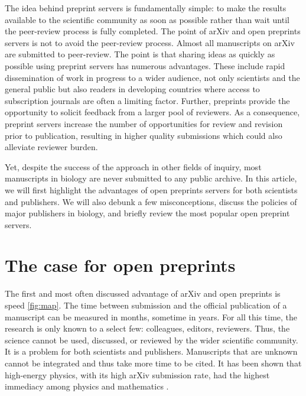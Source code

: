 \documentclass[letterpaper,twocolumn,superscriptaddress,showkeys]{revtex4}
\begin{document}
The idea behind preprint servers is fundamentally simple: to make the results
available to the scientific community as soon as possible rather than wait until
the peer-review process is fully completed. The point of arXiv and open
preprints servers is not to avoid the peer-review process. Almost all
manuscripts on arXiv are submitted to peer-review.  The point is that sharing
ideas as quickly as possible using preprint servers has numerous advantages.
These include rapid dissemination of work in progress to a wider audience, not
only scientists and the general public but also readers in developing countries
where access to subscription journals are often a limiting factor. Further,
preprints provide the opportunity to solicit feedback from a larger pool of
reviewers. As a consequence, preprint servers increase the number of
opportunities for review and revision prior to publication, resulting in higher
quality submissions which could also alleviate reviewer burden.

Yet, despite the success of the approach in other fields of inquiry, most
manuscripts in biology are never submitted to any public archive.  In this
article, we will first highlight the advantages of open preprints servers for
both scientists and publishers. We will also debunk a few misconceptions,
discuss the policies of major publishers in biology, and briefly review the most
popular open preprint servers.

\section{The case for open preprints}

The first and most often discussed advantage of arXiv and open preprints is
speed \ref{fig:map}. The time between submission and the official publication of
a manuscript can be measured in months, sometime in years. For all this time,
the research is only known to a select few: colleagues, editors, reviewers.
Thus, the science cannot be used, discussed, or reviewed by the wider scientific
community. It is a problem for both scientists and publishers. Manuscripts that
are unknown cannot be integrated and thus take more time to be cited. It has
been shown that high-energy physics, with its high arXiv submission rate, had
the highest immediacy among physics and mathematics \cite{pra05}.
\end{document}
